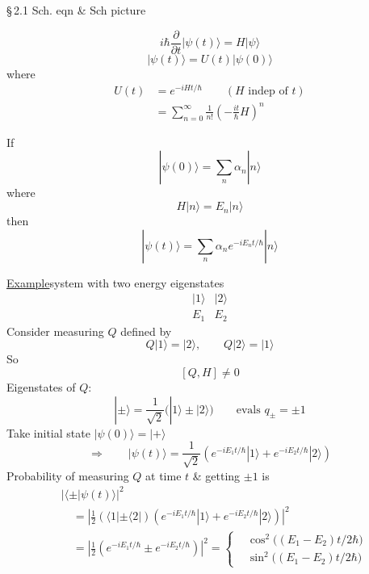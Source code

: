 \documentclass[11pt,a4paper]{article}
\begin{document}
\noindent
\S\,2.1 Sch. eqn \& Sch picture

\[
    i\hbar\frac{\partial}{\partial t}|\psi(t)\rangle=H|\psi\rangle
\]
\[
    |\psi(t)\rangle=U(t)|\psi(0)\rangle
\]
where
\begin{align*}
    U(t)&=e^{-iHt/\hbar}
    \qquad(H\text{ indep of }t)\\
    &=\sum_{n=0}^{\infty}\frac{1}{n!}
      \left(-\frac{it}{\hbar}H\right)^n
\end{align*}

If
\[
    |\psi(0)\rangle=\sum_n\alpha_n|n\rangle
\]
where
\[
    H|n\rangle=E_n|n\rangle
\]
then
\[
    |\psi(t)\rangle=\sum_n\alpha_n e^{-iE_nt/\hbar}|n\rangle
\]

\medskip
\noindent
\underline{Example}\qquad system with two energy eigenstates
\[
    \begin{array}{cc}
        |1\rangle&|2\rangle\\
        E_1&E_2
    \end{array}
\]
Consider measuring $Q$ defined by
\[
    Q|1\rangle=|2\rangle,\qquad Q|2\rangle=|1\rangle
\]
So
\[
    [Q,H]\neq0
\]
Eigenstates of $Q$:
\[
    |\pm\rangle=\frac{1}{\sqrt{2}}\bigl(|1\rangle\pm|2\rangle\bigr)
    \qquad\text{evals }q_\pm=\pm1
\]
Take initial state $|\psi(0)\rangle=|+\rangle$
\[
    \Rightarrow\qquad
    |\psi(t)\rangle=\frac{1}{\sqrt{2}}
    \left(e^{-iE_1t/\hbar}|1\rangle+e^{-iE_2t/\hbar}|2\rangle\right)
\]
Probability of measuring $Q$ at time $t$ \& getting $\pm1$ is
\begin{align*}
    &|\langle\pm|\psi(t)\rangle|^2\\
    &\quad=\left|\frac{1}{2}(\langle1|\pm\langle2|)
    \left(e^{-iE_1t/\hbar}|1\rangle+e^{-iE_2t/\hbar}|2\rangle\right)\right|^2\\
    &\quad=\left|\frac{1}{2}\left(e^{-iE_1t/\hbar}\pm e^{-iE_2t/\hbar}\right)\right|^2
    =\left\{\begin{aligned}
        &\cos^2\bigl((E_1-E_2)t/2\hbar\bigr)\\
        &\sin^2\bigl((E_1-E_2)t/2\hbar\bigr)
    \end{aligned}\right.
\end{align*}
\end{document}
